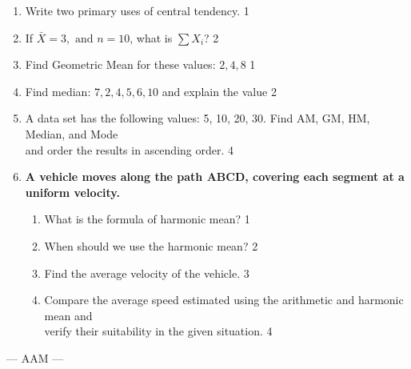 \documentclass[12pt]{article}
\begin{document}
  \begin{enumerate}
  
  \item Write two primary uses of central tendency. \hfill 1
  \item If $\bar{X} = 3 , \text{ and } n = 10$, what is $\sum X_i$? \hfill 2
  \item Find Geometric Mean for these values: $2, 4, 8$ \hfill 1
  \item Find median: $7,  2,  4,  5,  6, 10$ and explain the value \hfill 2
 \item A data set has the following values: 5, 10, 20, 30. Find AM, GM, HM, Median, and Mode \\ and order the results in ascending order. \hfill 4
 \item
  \textbf{A vehicle moves along the path ABCD, covering each segment at a uniform velocity.}

\begin{center}

  \end{center}
  \begin{enumerate}
    \item
	What is the formula of harmonic mean? \hfill 1
    \item
	When should we use the harmonic mean? \hfill 2
    \item  
	Find the average velocity of the vehicle. \hfill 3
    \item
	Compare the average speed estimated using the arithmetic and harmonic mean and \\ verify their suitability in the given situation. \hfill 4
  \end{enumerate}

\end{enumerate}
\begin{center}
--- AAM ---
\end{center}
\end{document}
